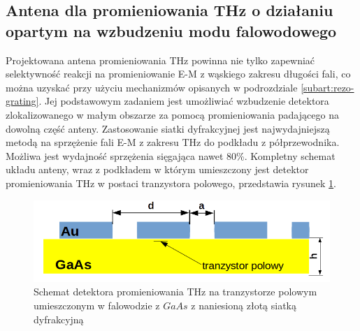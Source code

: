 \subsection{Antena dla promieniowania THz o działaniu opartym na wzbudzeniu modu falowodowego}
\label{subart:antenaThz}
Projektowana antena promieniowania THz powinna nie tylko zapewniać selektywność reakcji na promieniowanie E-M z wąskiego zakresu długości fali, co można uzyskać przy użyciu mechanizmów opisanych w podrozdziale \ref{subart:rezo-grating}. Jej podstawowym zadaniem jest umożliwiać wzbudzenie detektora zlokalizowanego w małym obszarze za pomocą promieniowania padającego na dowolną część anteny. Zastosowanie siatki dyfrakcyjnej jest najwydajniejszą metodą na sprzężenie fali E-M z zakresu THz do podkładu z półprzewodnika. Możliwa jest wydajność sprzężenia sięgająca nawet 80\%\cite{roux2002grating}.  Kompletny schemat układu anteny, wraz z podkładem w którym umieszczony jest detektor promieniowania THz w postaci tranzystora polowego, przedstawia rysunek \ref{fig:schem-podklad-falo}.
\begin{figure}[tb]
	\centering
	\includegraphics[width=\textwidth]{images/thz/schemat-podklad-falo.png}
	\caption{Schemat detektora promieniowania THz na tranzystorze polowym umieszczonym w falowodzie z $GaAs$ z naniesioną złotą siatką dyfrakcyjną}
	\label{fig:schem-podklad-falo}
\end{figure}


